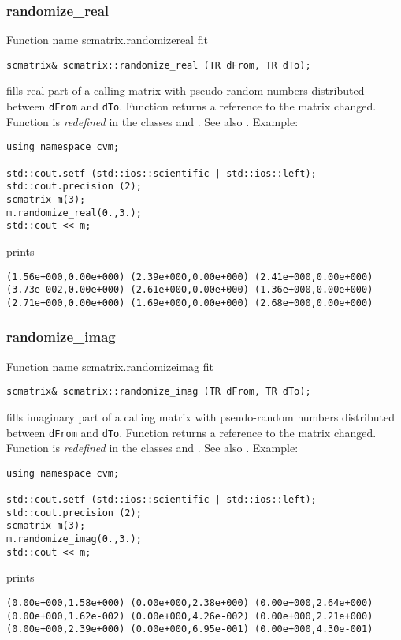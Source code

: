 \subsubsection{randomize\_real}
Function%
\pdfdest name {scmatrix.randomizereal} fit
\begin{verbatim}
scmatrix& scmatrix::randomize_real (TR dFrom, TR dTo);
\end{verbatim}
fills  real part of a calling matrix with 
pseudo-random numbers distributed between
\verb"dFrom" and \verb"dTo".
Function
returns a reference to the matrix changed.
Function is \emph{redefined} in the classes
 and
.
See also
.
Example:
\begin{Verbatim}
using namespace cvm;

std::cout.setf (std::ios::scientific | std::ios::left); 
std::cout.precision (2);
scmatrix m(3);
m.randomize_real(0.,3.);
std::cout << m;
\end{Verbatim}
prints
\begin{Verbatim}
(1.56e+000,0.00e+000) (2.39e+000,0.00e+000) (2.41e+000,0.00e+000)
(3.73e-002,0.00e+000) (2.61e+000,0.00e+000) (1.36e+000,0.00e+000)
(2.71e+000,0.00e+000) (1.69e+000,0.00e+000) (2.68e+000,0.00e+000)
\end{Verbatim}
\newpage


\subsubsection{randomize\_imag}
Function%
\pdfdest name {scmatrix.randomizeimag} fit
\begin{verbatim}
scmatrix& scmatrix::randomize_imag (TR dFrom, TR dTo);
\end{verbatim}
fills  imaginary part of a calling matrix with 
pseudo-random numbers distributed between
\verb"dFrom" and \verb"dTo".
Function
returns a reference to the matrix changed.
Function is \emph{redefined} in the classes
 and
.
See also
.
Example:
\begin{Verbatim}
using namespace cvm;

std::cout.setf (std::ios::scientific | std::ios::left); 
std::cout.precision (2);
scmatrix m(3);
m.randomize_imag(0.,3.);
std::cout << m;
\end{Verbatim}
prints
\begin{Verbatim}
(0.00e+000,1.58e+000) (0.00e+000,2.38e+000) (0.00e+000,2.64e+000)
(0.00e+000,1.62e-002) (0.00e+000,4.26e-002) (0.00e+000,2.21e+000)
(0.00e+000,2.39e+000) (0.00e+000,6.95e-001) (0.00e+000,4.30e-001)
\end{Verbatim}
\newpage

